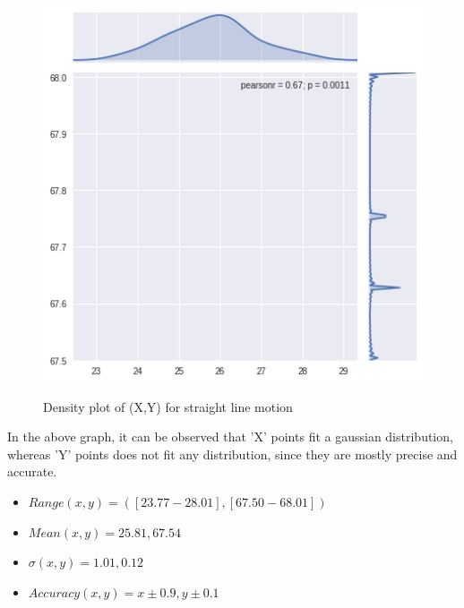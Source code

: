 \documentclass[11pt,a4paper,titlepage]{article}
\begin{document}
\begin{itemize}
  \begin{figure}[H]
	\centering	
		\includegraphics[width=0.8\linewidth]{straightG}
		\label{fig:sub1}
	\caption{\color{blue}Density plot of (X,Y) for straight line motion}
  \end{figure}
  In the above graph, it can be observed that 'X' points fit a gaussian distribution, whereas 'Y' points does not fit any distribution, since they are mostly precise and accurate.
\begin{itemize}
\item $ Range (x,y) =([23.77-28.01],[67.50-68.01]) $
\item $ Mean (x, y) = 25.81,67.54$
\item $ \sigma (x, y)= 1.01, 0.12 $
\item $ Accuracy (x,y) = x \pm0.9  , y \pm0.1 $  
\end{itemize}

\end{itemize}
\end{document}
